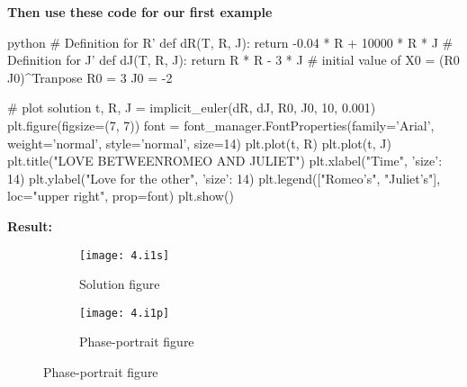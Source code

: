 \documentclass[a4paper]{article}
\begin{document}
\textbf{Then use these code for our first example}
\begin{code}{python}
# Definition for R'
def dR(T, R, J):
    return -0.04 * R + 10000 * R * J
# Definition for J'
def dJ(T, R, J):
    return R * R - 3 * J
# initial value of X0 = (R0 J0)^Tranpose 
R0 = 3
J0 = -2


# plot solution
t, R, J = implicit_euler(dR, dJ, R0, J0, 10, 0.001)
plt.figure(figsize=(7, 7))
font = font_manager.FontProperties(family='Arial',
                                   weight='normal',
                                   style='normal', size=14)
plt.plot(t, R)
plt.plot(t, J)
plt.title("LOVE BETWEEN\n ROMEO AND JULIET")
plt.xlabel("Time", {'size': 14})
plt.ylabel("Love for the other", {'size': 14})
plt.legend(["Romeo's", "Juliet's"], loc="upper right", prop=font)
plt.show()
\end{code}
\newpage
\textbf{Result: }
\begin{figure}[H]
\centering
\begin{subfigure}{.5\textwidth}
  \centering
  \texttt{[image: 4.i1s]}
  \caption*{Solution figure}
\end{subfigure}%
\begin{subfigure}{.5\textwidth}
  \centering
  \texttt{[image: 4.i1p]}
  \caption*{Phase-portrait figure}
\end{subfigure}
\end{figure}
\end{document}
